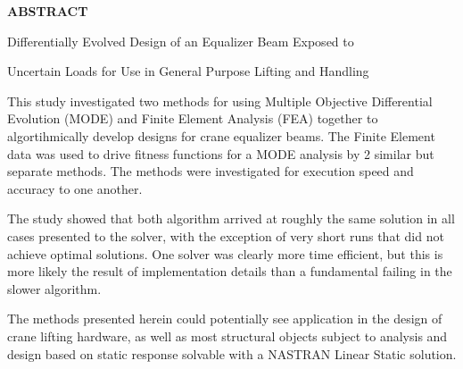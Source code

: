 {\LARGE\center
  \textbf{\uppercase{Abstract}}\par
}

{\Large{ {\centerline{Differentially Evolved Design of an Equalizer Beam Exposed to}}}}
{\Large{ {\centerline{Uncertain Loads for Use in General Purpose Lifting and Handling}}}}

\vspace{1cm}

This study investigated two methods for using Multiple Objective Differential Evolution (MODE) and Finite Element Analysis (FEA) together to algortihmically develop designs for crane equalizer beams. The Finite Element data was used to drive fitness functions for a MODE analysis by 2 similar but separate methods. The methods were investigated for execution speed and accuracy to one another. 

The study showed that both algorithm arrived at roughly the same solution in all cases presented to the solver, with the exception of very short runs that did not achieve optimal solutions. One solver was clearly more time efficient, but this is more likely the result of implementation details than a fundamental failing in the slower algorithm. 

The methods presented herein could potentially see application in the design of crane lifting hardware, as well as most structural objects subject to analysis and design based on static response solvable with a NASTRAN Linear Static solution. 
